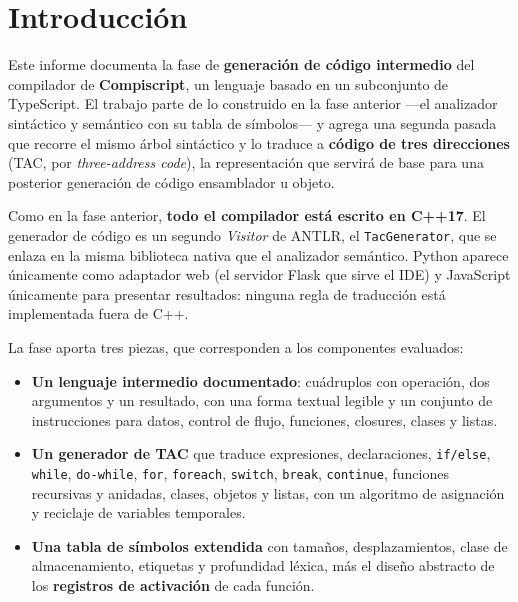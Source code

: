 \documentclass[11pt,a4paper]{article}
\begin{document}
\tableofcontents
\newpage

\section{Introducción}

Este informe documenta la fase de \textbf{generación de código intermedio} del
compilador de \textbf{Compiscript}, un lenguaje basado en un subconjunto de
TypeScript. El trabajo parte de lo construido en la fase anterior ---el
analizador sintáctico y semántico con su tabla de símbolos--- y agrega una
segunda pasada que recorre el mismo árbol sintáctico y lo traduce a
\textbf{código de tres direcciones} (TAC, por \emph{three-address code}), la
representación que servirá de base para una posterior generación de código
ensamblador u objeto.

Como en la fase anterior, \textbf{todo el compilador está escrito en C++17}.
El generador de código es un segundo \emph{Visitor} de ANTLR, el
\texttt{TacGenerator}, que se enlaza en la misma biblioteca nativa que el
analizador semántico. Python aparece únicamente como adaptador web (el servidor
Flask que sirve el IDE) y JavaScript únicamente para presentar resultados:
ninguna regla de traducción está implementada fuera de C++.

La fase aporta tres piezas, que corresponden a los componentes evaluados:

\begin{itemize}[leftmargin=1.4em]
  \item \textbf{Un lenguaje intermedio documentado}: cuádruplos con operación,
        dos argumentos y un resultado, con una forma textual legible y un
        conjunto de instrucciones para datos, control de flujo, funciones,
        closures, clases y listas.
  \item \textbf{Un generador de TAC} que traduce expresiones, declaraciones,
        \texttt{if/else}, \texttt{while}, \texttt{do-while}, \texttt{for},
        \texttt{foreach}, \texttt{switch}, \texttt{break}, \texttt{continue},
        funciones recursivas y anidadas, clases, objetos y listas, con un
        algoritmo de asignación y reciclaje de variables temporales.
  \item \textbf{Una tabla de símbolos extendida} con tamaños, desplazamientos,
        clase de almacenamiento, etiquetas y profundidad léxica, más el diseño
        abstracto de los \textbf{registros de activación} de cada función.
\end{itemize}
\end{document}
